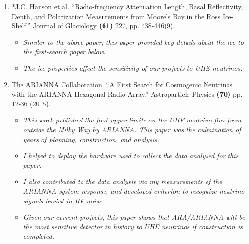 \documentclass[../../main.tex]{subfiles}
\begin{document}
\begin{enumerate}
\begin{itemize}
\end{itemize}
\item *J.C. Hanson et al. ``Radio-frequency Attenuation Length, Basal Reflectivity, Depth, and Polarization Measurements from Moore's Bay in the Ross Ice-Shelf.'' Journal of Glaciology \textbf{(61)} 227, pp. 438-446(9).
\begin{itemize}
\item \textit{Similar to the above paper, this paper provided key details about the ice to the first-search paper below.}
\item \textit{The ice properties affect the sensitivity of our projects to UHE neutrinos.}
\end{itemize}
\item The ARIANNA Collaboration. ``A First Search for Cosmogenic Neutrinos with the ARIANNA Hexagonal Radio Array.'' Astroparticle Physics \textbf{(70)} pp. 12-36 (2015).
\begin{itemize}
\item \textit{This work published the first upper limits on the UHE neutrino flux from outside the Milky Way by ARIANNA.  This paper was the culmination of years of planning, construction, and analysis.}
\item \textit{I helped to deploy the hardware used to collect the data analyzed for this paper.}
\item \textit{I also contributed to the data analysis via my measurements of the ARIANNA system response, and developed criterion to recognize neutrino signals buried in RF noise.}
\item \textit{Given our current projects, this paper shows that ARA/ARIANNA will be the most sensitive detector in history to UHE neutrinos if construction is completed.}
\end{itemize}
\end{enumerate}
\end{document}
